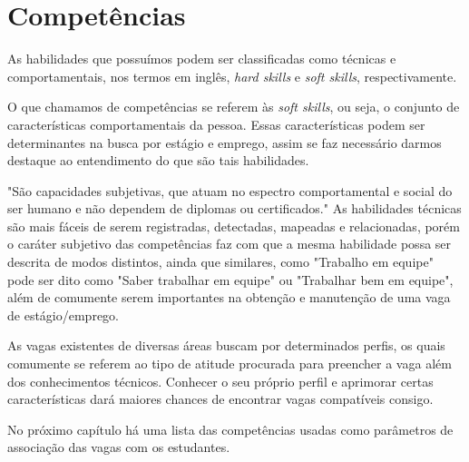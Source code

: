 \section{Competências}

As habilidades que possuímos podem ser classificadas como técnicas e comportamentais, nos termos em inglês, \emph{hard skills} e \emph{soft skills}, respectivamente.

O que chamamos de competências se referem às \emph{soft skills}, ou seja, o conjunto de características comportamentais da pessoa. Essas características podem ser determinantes na busca por estágio e emprego, assim se faz necessário darmos destaque ao entendimento do que são tais habilidades.

"São capacidades subjetivas, que atuam no espectro comportamental e social do ser humano e não dependem de diplomas ou certificados."\cite{alura_softskills} As habilidades técnicas são mais fáceis de serem registradas, detectadas, mapeadas e relacionadas, porém o caráter subjetivo das competências faz com que a mesma habilidade possa ser descrita de modos distintos, ainda que similares, como "Trabalho em equipe" pode ser dito como "Saber trabalhar em equipe" ou "Trabalhar bem em equipe", além de comumente serem importantes na obtenção e manutenção de uma vaga de estágio/emprego.

As vagas existentes de diversas áreas buscam por determinados perfis, os quais comumente se referem ao tipo de atitude procurada para preencher a vaga além dos conhecimentos técnicos. Conhecer o seu próprio perfil e aprimorar certas características dará maiores chances de encontrar vagas compatíveis consigo.

No próximo capítulo há uma lista das competências usadas como parâmetros de associação das vagas com os estudantes.